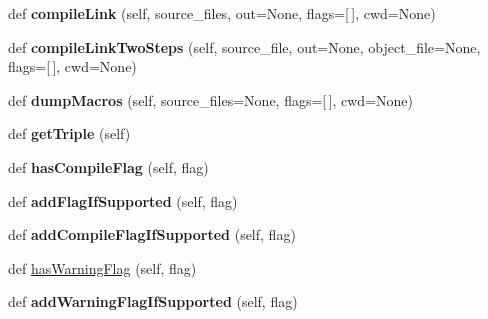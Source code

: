 \begin{DoxyCompactItemize}
\item 
\mbox{\label{classlibcxx_1_1compiler_1_1_c_x_x_compiler_a02194046dd567cb66d41ae1b9af9adf4}} 
def {\bfseries compile\+Link} (self, source\+\_\+files, out=None, flags=\mbox{[}$\,$\mbox{]}, cwd=None)
\item 
\mbox{\label{classlibcxx_1_1compiler_1_1_c_x_x_compiler_a311a6e23ca9d61580a1f150a554503c9}} 
def {\bfseries compile\+Link\+Two\+Steps} (self, source\+\_\+file, out=None, object\+\_\+file=None, flags=\mbox{[}$\,$\mbox{]}, cwd=None)
\item 
\mbox{\label{classlibcxx_1_1compiler_1_1_c_x_x_compiler_a94d302dc93fc9bb988313778d11541a2}} 
def {\bfseries dump\+Macros} (self, source\+\_\+files=None, flags=\mbox{[}$\,$\mbox{]}, cwd=None)
\item 
\mbox{\label{classlibcxx_1_1compiler_1_1_c_x_x_compiler_ad4635ba72ec49ae590b7e371fb6dbf69}} 
def {\bfseries get\+Triple} (self)
\item 
\mbox{\label{classlibcxx_1_1compiler_1_1_c_x_x_compiler_a3495c4b8c173d0e71d689bd32b9d13e8}} 
def {\bfseries has\+Compile\+Flag} (self, flag)
\item 
\mbox{\label{classlibcxx_1_1compiler_1_1_c_x_x_compiler_a76992e8829c0efd06ce0b82ae1dadb4d}} 
def {\bfseries add\+Flag\+If\+Supported} (self, flag)
\item 
\mbox{\label{classlibcxx_1_1compiler_1_1_c_x_x_compiler_ab0a05d619f44a2f033c388084aa97e89}} 
def {\bfseries add\+Compile\+Flag\+If\+Supported} (self, flag)
\item 
def \mbox{\hyperlink{classlibcxx_1_1compiler_1_1_c_x_x_compiler_a6ebec3239cbae932839399bca06ac495}{has\+Warning\+Flag}} (self, flag)
\item 
\mbox{\label{classlibcxx_1_1compiler_1_1_c_x_x_compiler_a2ad2eebb615014004d5902d3d15165a9}} 
def {\bfseries add\+Warning\+Flag\+If\+Supported} (self, flag)
\end{DoxyCompactItemize}
